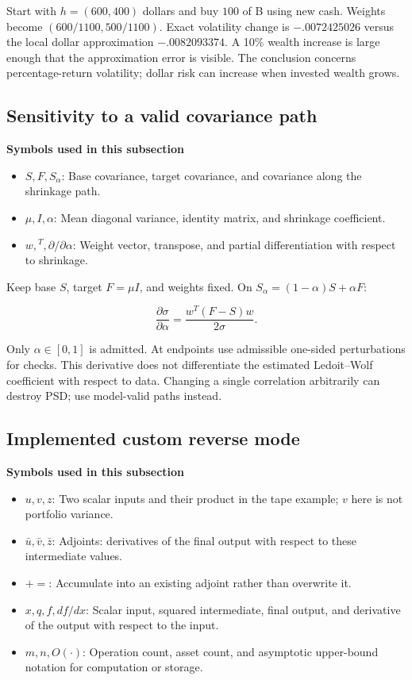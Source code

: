 \documentclass[
  american,
  11pt,
]{article}
\begin{document}
Start with \(h=(600,400)\) dollars and buy \(100\) of B using new cash.
Weights become \((600/1100,500/1100)\). Exact volatility change is
\(-.0072425026\) versus the local dollar approximation \(-.0082093374\).
A 10\% wealth increase is large enough that the approximation error is
visible. The conclusion concerns percentage-return volatility; dollar
risk can increase when invested wealth grows.

\subsection{Sensitivity to a valid covariance
path}\label{sensitivity-to-a-valid-covariance-path}

\textbf{Symbols used in this subsection}
\begin{itemize}
\item \(S,F,S_\alpha\): Base covariance, target covariance, and covariance along the shrinkage path.
\item \(\mu,I,\alpha\): Mean diagonal variance, identity matrix, and shrinkage coefficient.
\item \(w,{}^T,\partial/\partial\alpha\): Weight vector, transpose, and partial differentiation with respect to shrinkage.
\end{itemize}


Keep base \(S\), target \(F=\mu I\), and weights fixed. On
\(S_\alpha=(1-\alpha)S+\alpha F\):

\[\frac{\partial\sigma}{\partial\alpha}=\frac{w^T(F-S)w}{2\sigma}.\]

Only \(\alpha\in[0,1]\) is admitted. At endpoints use admissible
one-sided perturbations for checks. This derivative does not
differentiate the estimated Ledoit--Wolf coefficient with respect to
data. Changing a single correlation arbitrarily can destroy PSD; use
model-valid paths instead.

\subsection{Implemented custom reverse
mode}\label{implemented-custom-reverse-mode}

\textbf{Symbols used in this subsection}
\begin{itemize}
\item \(u,v,z\): Two scalar inputs and their product in the tape example; $v$ here is not portfolio variance.
\item \(\bar u,\bar v,\bar z\): Adjoints: derivatives of the final output with respect to these intermediate values.
\item \(\mathrel{+}=\): Accumulate into an existing adjoint rather than overwrite it.
\item \(x,q,f,df/dx\): Scalar input, squared intermediate, final output, and derivative of the output with respect to the input.
\item \(m,n,O(\cdot)\): Operation count, asset count, and asymptotic upper-bound notation for computation or storage.
\end{itemize}
\end{document}
